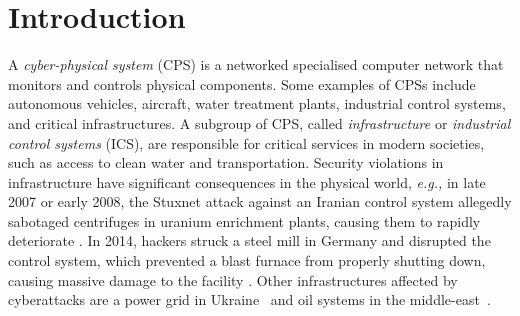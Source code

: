 
\section{Introduction}
A \emph{cyber-physical system} (CPS) is a networked specialised computer network that monitors and controls physical components. %
Some examples of CPSs include autonomous vehicles, aircraft, water treatment plants, industrial control systems, and critical infrastructures. 
A subgroup of CPS, called \emph{infrastructure} or \emph{industrial control systems} (ICS), are responsible for critical services in modern societies, such as access to clean water and transportation. Security violations in infrastructure have significant consequences in the physical world, \emph{e.g.,} in late 2007 or early 2008, the Stuxnet attack against an Iranian control system allegedly sabotaged centrifuges in uranium enrichment plants, causing them to rapidly deteriorate \cite{StuxnetWeb,Stuxnet}.
In 2014, hackers struck a steel mill in Germany and disrupted the control system, which prevented a blast furnace from properly shutting down, causing massive damage to the facility \cite{WiredArticle,Lagebericht2014}.
Other infrastructures affected by cyberattacks are a power grid in Ukraine~\cite{cherepanov2017industroyer} and oil systems in the middle-east~\cite{johnson2018attackers}.

